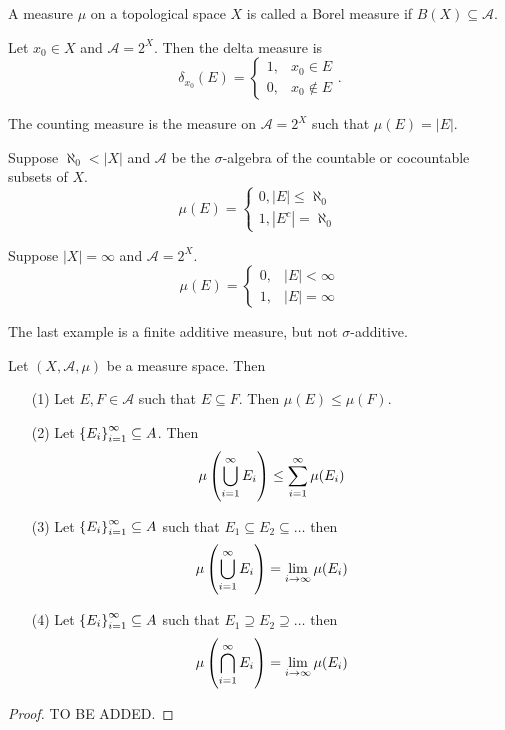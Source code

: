 \documentclass[11pt,a4paper]{article}
\newcommand{\A}{\mathcal A}
\begin{document}
\begin{definition}
  A measure $\mu$ on a topological space $X$ is called a Borel measure
  if $B(X) \subseteq \A$.
\end{definition}


\begin{example}
  Let $x_0 \in X$ and $\A = 2^X$.
  Then the delta measure is
  \[
    \delta_{x_0}(E) =
    \begin{cases}
      1, &x_0 \in E \\
      0, &x_0 \notin E
    \end{cases}.
  \]
\end{example}

\begin{example}
  The counting measure is the measure on $\A = 2^X$ such that
  $\mu(E) = |E|$.
\end{example}

\begin{example}
  Suppose $\aleph_0 < |X|$ and $\A$ be the $\sigma$-algebra of the countable
  or cocountable subsets of $X$.
  \[
    \mu(E) =
    \begin{cases}
      0, |E| \le \aleph_0 \\
      1, |E^c| = \aleph_0
    \end{cases}
  \]
\end{example}

\begin{example}
  Suppose $|X| = \infty$ and $\A = 2^X$.
  \[
    \mu(E) =
    \begin{cases}
      0, &|E| < \infty \\
      1, &|E| = \infty
    \end{cases}
  \]
\end{example}
\begin{remark}
  The last example is a finite additive measure, but not $\sigma$-additive.
\end{remark}

\begin{proposition}
  Let $(X, \A, \mu)$ be a measure space.
  Then
  \begin{enumerate}
    \item[(1)] Let $E,F \in \A$ such that $E \subseteq F$.
      Then $\mu(E) \le \mu(F)$.
    \item[(2)] Let $\set{E_i}_{i=1}^{\infty} \subseteq A$.
      Then
      \[
        \mu\del{\bigcup_{i=1}^{\infty} E_i} \le \sum_{i=1}^{\infty} \mu(E_i)
      \]
    \item[(3)] Let $\set{E_i}_{i=1}^{\infty} \subseteq A$ such that
      $E_1 \subseteq E_2 \subseteq \dots$ then
      \[
        \mu\del{\bigcup_{i=1}^{\infty} E_i} =
        \lim_{i \to \infty} \mu(E_i)
      \]
    \item[(4)] Let $\set{E_i}_{i=1}^{\infty} \subseteq A$ such that
      $E_1 \supseteq E_2 \supseteq \dots$ then
      \[
        \mu\del{\bigcap_{i=1}^{\infty} E_i} =
        \lim_{i \to \infty} \mu(E_i)
      \]
  \end{enumerate}
\end{proposition}
\begin{proof}
  TO BE ADDED.
\end{proof}
\end{document}
